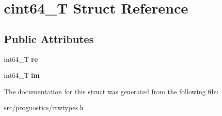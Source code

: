 \hypertarget{structcint64__T}{}\section{cint64\+\_\+T Struct Reference}
\label{structcint64__T}
\subsection*{Public Attributes}
\begin{DoxyCompactItemize}
\item 
\mbox{\label{structcint64__T_a7f1103e9743025736ac765ab6907b069}} 
int64\+\_\+T {\bfseries re}
\item 
\mbox{\label{structcint64__T_a5331d145e43d4b39c6a457750665106d}} 
int64\+\_\+T {\bfseries im}
\end{DoxyCompactItemize}


The documentation for this struct was generated from the following file\+:\begin{DoxyCompactItemize}
\item 
src/prognostics/rtwtypes.\+h\end{DoxyCompactItemize}
